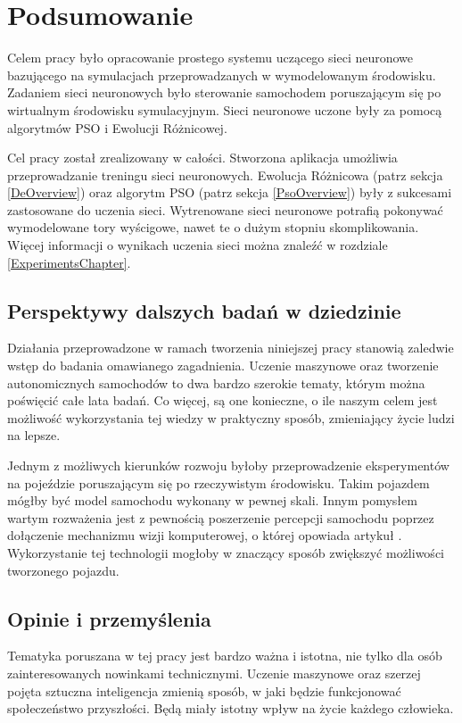 \chapter*{Podsumowanie}

Celem pracy było opracowanie prostego systemu uczącego sieci neuronowe bazującego na symulacjach przeprowadzanych w wymodelowanym środowisku. Zadaniem sieci neuronowych było sterowanie samochodem poruszającym się po wirtualnym środowisku symulacyjnym. Sieci neuronowe uczone były za pomocą algorytmów PSO i Ewolucji Różnicowej.

Cel pracy został zrealizowany w całości. Stworzona aplikacja umożliwia przeprowadzanie treningu sieci neuronowych. Ewolucja Różnicowa (patrz sekcja \ref{DeOverview}) oraz algorytm PSO (patrz sekcja \ref{PsoOverview}) były z sukcesami zastosowane do uczenia sieci. Wytrenowane sieci neuronowe potrafią pokonywać wymodelowane tory wyścigowe, nawet te o dużym stopniu skomplikowania. Więcej informacji o wynikach uczenia sieci można znaleźć w rozdziale \ref{ExperimentsChapter}.

\section*{Perspektywy dalszych badań w dziedzinie}
Działania przeprowadzone w ramach tworzenia niniejszej pracy stanowią zaledwie wstęp do badania omawianego zagadnienia. Uczenie maszynowe oraz tworzenie autonomicznych samochodów to dwa bardzo szerokie tematy, którym można poświęcić całe lata badań. Co więcej, są one konieczne, o ile naszym celem jest możliwość wykorzystania tej wiedzy w praktyczny sposób, zmieniający życie ludzi na lepsze.

Jednym z możliwych kierunków rozwoju byłoby przeprowadzenie eksperymentów na pojeździe poruszającym się po rzeczywistym środowisku. Takim pojazdem mógłby być model samochodu wykonany w pewnej skali. Innym pomysłem wartym rozważenia jest z pewnością poszerzenie percepcji samochodu poprzez dołączenie mechanizmu wizji komputerowej, o której opowiada artykuł \cite{computerVision:overview}. Wykorzystanie tej technologii mogłoby w znaczący sposób zwiększyć możliwości tworzonego pojazdu.

\section*{Opinie i przemyślenia}
Tematyka poruszana w tej pracy jest bardzo ważna i istotna, nie tylko dla osób zainteresowanych nowinkami technicznymi. Uczenie maszynowe oraz szerzej pojęta sztuczna inteligencja zmienią sposób, w jaki będzie funkcjonować społeczeństwo przyszłości. Będą miały istotny wpływ na życie każdego człowieka. 

